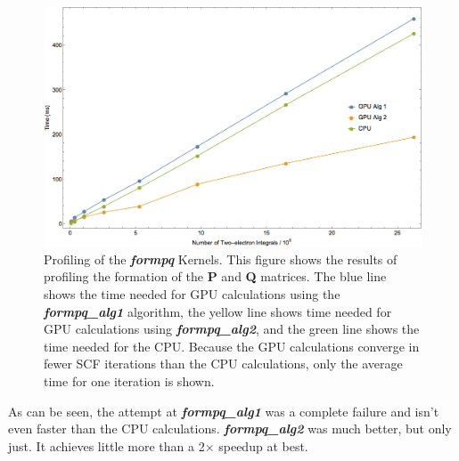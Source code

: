 \documentclass[12pt]{report}
\newcommand{\kernel}[1]{\textit{\textbf{#1}}}
\begin{document}
\begin{figure}[h!]
\includegraphics[width=1\textwidth]{Figures/formpqprof.png}
\caption[Profiling of the \kernel{formpq} Kernels.]
{Profiling of the \kernel{formpq} Kernels. This figure shows the results of profiling the formation of the \textbf{P} and \textbf{Q} matrices. The blue line shows the time needed for GPU calculations using the \kernel{formpq\_alg1} algorithm, the yellow line shows time needed for GPU calculations using \kernel{formpq\_alg2}, and the green line shows the time needed for the CPU. Because the GPU calculations converge in fewer SCF iterations than the CPU calculations, only the average time for one iteration is shown.}
\label{fig:formpqprof}
\end{figure}

As can be seen, the attempt at \kernel{formpq\_alg1} was a complete failure and isn't even faster than the CPU calculations. \kernel{formpq\_alg2} was much better, but only just. It achieves little more than a 2$\times$ speedup at best. 
\end{document}
